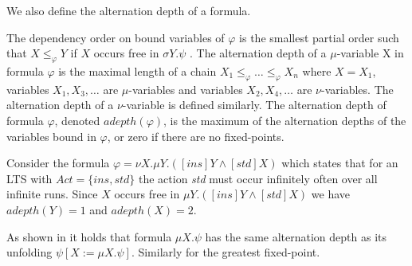 We also define the alternation depth of a formula.
\begin{definition}
	The dependency order on bound variables of $\varphi$	is the smallest partial order such that $X \leq_\varphi Y$ if $X$ occurs free in $\sigma Y. \psi$ . The alternation depth of a $\mu$-variable X in formula $\varphi $ is the maximal length of a chain $X_1 \leq_\varphi  \dots \leq_\varphi X_n$ where $X = X_1$, variables $X_1, X_3, \dots$ are $\mu$-variables and variables $X_2, X_4, \dots$ are $\nu$-variables. The alternation depth of a $\nu$-variable is defined similarly. The alternation depth of formula $\varphi$, denoted $adepth(\varphi)$, is the maximum of the alternation depths of the variables bound in $\varphi$, or zero if there are no fixed-points.
\end{definition}
\begin{example}
	Consider the formula $\varphi = \nu X. \mu Y. ([ins]Y \wedge [std] X)$ which states that for an LTS with $Act = \{ ins, std\}$ the action \textit{std} must occur infinitely often over all infinite runs. Since $X$ occurs free in $\mu Y. ([ins] Y \wedge [std]X)$ we have $adepth(Y) = 1$ and $adepth(X) = 2$.
\end{example}
As shown in \cite{Bradfield2018} it holds that formula $\mu X. \psi$ has the same alternation depth as its unfolding $\psi[X:=\mu X. \psi]$. Similarly for the greatest fixed-point. 

